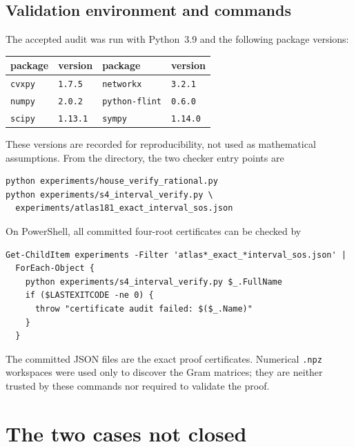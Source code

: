 \documentclass[11pt]{article}
\begin{document}
\subsection{Validation environment and commands}

The accepted audit was run with Python~3.9 and the following package
versions:
\begin{center}
\begin{tabular}{ll@{\qquad}ll}
\toprule
package & version & package & version\\
\midrule
\texttt{cvxpy} & \texttt{1.7.5} & \texttt{networkx} & \texttt{3.2.1}\\
\texttt{numpy} & \texttt{2.0.2} & \texttt{python-flint} & \texttt{0.6.0}\\
\texttt{scipy} & \texttt{1.13.1} & \texttt{sympy} & \texttt{1.14.0}\\
\bottomrule
\end{tabular}
\end{center}
These versions are recorded for reproducibility, not used as mathematical
assumptions.  From the  directory, the two checker
entry points are
\begin{verbatim}
python experiments/house_verify_rational.py
python experiments/s4_interval_verify.py \
  experiments/atlas181_exact_interval_sos.json
\end{verbatim}
On PowerShell, all committed four-root certificates can be checked by
\begin{verbatim}
Get-ChildItem experiments -Filter 'atlas*_exact_*interval_sos.json' |
  ForEach-Object {
    python experiments/s4_interval_verify.py $_.FullName
    if ($LASTEXITCODE -ne 0) {
      throw "certificate audit failed: $($_.Name)"
    }
  }
\end{verbatim}
The committed JSON files are the exact proof certificates.  Numerical
\texttt{.npz} workspaces were used only to discover the Gram matrices; they
are neither trusted by these commands nor required to validate the proof.

\section{The two cases not closed}
\end{document}
